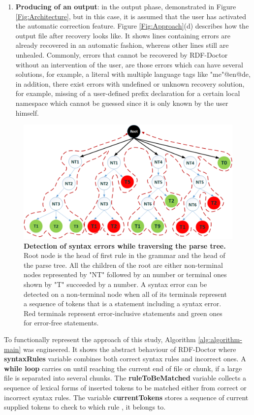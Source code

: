 \begin{enumerate}[label=(\alph*)]
\item\textbf {Producing of an output}: in the output phase, demonstrated in Figure \ref{Fig:Architecture}, but in this case,  it is assumed that the user has activated the automatic correction feature.  
{Figure \ref{Fig:Approach}}(d) describes how the output file after recovery  looks like. It shows lines containing errors are already recovered in an automatic fashion, whereas other  lines still are unhealed.
Commonly, errors that cannot be recovered by RDF-Doctor without an intervention of the user, are those errors which can have several solutions, for example, a literal with multiple language tags like "me"@en@de, in addition, there exist errors with undefined or unknown recovery solution, for example, missing of a user-defined prefix declaration for a certain local namespace which cannot be guessed since it is only known by the user himself. 
\end{enumerate} 
\begin{figure}
	\centering
	  	\includegraphics[width=.8\textwidth]{images/approachParseTree.png}
		\caption{\textbf{Detection of syntax errors while traversing the parse tree.} 
		Root node is the head of first rule in the grammar and the head of the parse tree.
		All the children of the root are either non-terminal nodes represented by "NT" followed by an number or  terminal ones shown by "T" succeeded by a number. 
		A syntax error can be detected on a non-terminal node when all of its terminals represent a sequence of tokens that is a statement including a syntax error. Red terminals represent error-inclusive statements and green ones for error-free statements.}
		\label{Fig:approachParseTree}  
\end{figure}


To functionally represent the approach of this study, Algorithm \ref{alg:algorithm-main} was engineered. 
It shows the abstract behaviour of RDF-Doctor where \textbf{syntaxRules} variable combines both correct syntax rules and incorrect ones. 
A \textbf{while loop} carries on until reaching the current end of file or chunk, if a large file is separated into several chunks. 
The \textbf{ruleToBeMatched} variable collects a sequence of lexical forms of inserted tokens to be matched either from correct or incorrect syntax rules. The variable \textbf{currentTokens} stores a sequence of current supplied tokens to check to which rule , it belongs to.  

